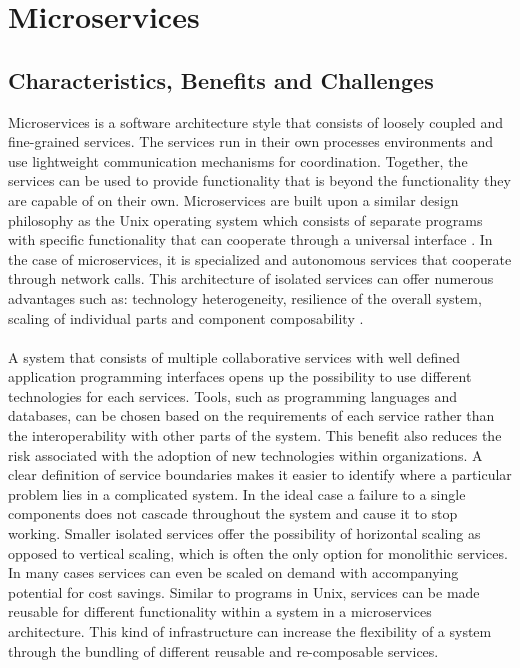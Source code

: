 \chapter{Microservices}
\label{chapter:microservices}

\section{Characteristics, Benefits and Challenges}

Microservices is a software architecture style that consists of loosely coupled and fine-grained services. The services run in their own processes environments and use lightweight communication mechanisms for coordination. Together, the services can be used to provide functionality that is beyond the functionality they are capable of on their own. Microservices are built upon a similar design philosophy as the Unix operating system which consists of separate programs with specific functionality that can cooperate through a universal interface \cite{raymond2003art}. In the case of microservices, it is specialized and autonomous services that cooperate through network calls. This architecture of isolated services can offer numerous advantages such as: technology heterogeneity, resilience of the overall system, scaling of individual parts and component composability \cite{newman2015building}.
\\ \\
A system that consists of multiple collaborative services with well defined application programming interfaces opens up the possibility to use different technologies for each services. Tools, such as programming languages and databases, can be chosen based on the requirements of each service rather than the interoperability with other parts of the system. This benefit also reduces the risk associated with the adoption of new technologies within organizations. A clear definition of service boundaries makes it easier to identify where a particular problem lies in a complicated system. In the ideal case a failure to a single components does not cascade throughout the system and cause it to stop working. Smaller isolated services offer the possibility of horizontal scaling as opposed to vertical scaling, which is often the only option for monolithic services. In many cases services can even be scaled on demand with accompanying potential for cost savings. Similar to programs in Unix, services can be made reusable for different functionality within a system in a microservices architecture. This kind of infrastructure can increase the flexibility of a system through the bundling of different reusable and re-composable services.
